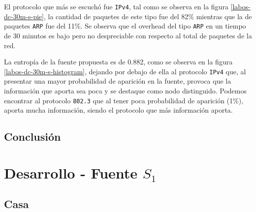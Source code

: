 \documentclass[final,inline,a4paper,narroweqnarray]{ieee}
\begin{document}
  El protocolo que más se escuchó fue \texttt{IPv4}, tal como se
  observa en la figura \ref{labos-dc-30m-s-pie}, la cantidad de
  paquetes  de este tipo fue del 82\% mientras que la de paquetes
  \texttt{ARP} fue del 11\%. Se observa que el overhead del tipo \texttt{ARP} 
  en un tiempo de 30 minutos es bajo pero no despreciable con respecto al 
  total de paquetes de la red.

  La entropía de la fuente propuesta es de 0.882, como se observa en la
  figura \ref{labos-dc-30m-s-histogram}, dejando por debajo de ella al
  protocolo \texttt{IPv4} que, al presentar una mayor probabilidad de
  aparición en la fuente, provoca que la información que aporta sea
  poca y se destaque como nodo distinguido. Podemos encontrar al protocolo 
  \texttt{802.3} que al tener poca probabilidad de aparición
  (1\%), aporta mucha información, siendo el protocolo que más información
  aporta.

    \subsection{Conclusión}




\section{Desarrollo - Fuente $S_1$}
  \subsection{Casa}
\end{document}
